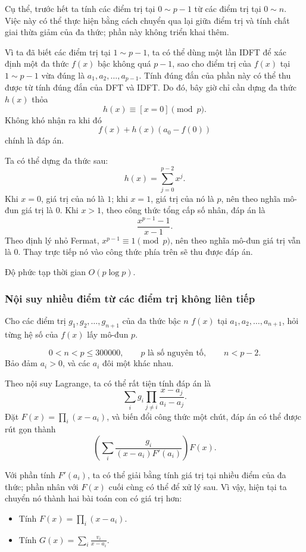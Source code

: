 \documentclass[11pt]{article}
\begin{document}
Cụ thể, trước hết ta tính các điểm trị tại \(0\sim p-1\) từ các điểm trị tại
\(0\sim n\). Việc này có thể thực hiện bằng cách chuyển qua lại giữa điểm trị
và tính chất giai thừa giảm của đa thức; phần này không triển khai thêm.

Vì ta đã biết các điểm trị tại \(1\sim p-1\), ta có thể dùng một lần IDFT để
xác định một đa thức \(f(x)\) bậc không quá \(p-1\), sao cho điểm trị của
\(f(x)\) tại \(1\sim p-1\) vừa đúng là \(a_1,a_2,\ldots,a_{p-1}\). Tính đúng
đắn của phần này có thể thu được từ tính đúng đắn của DFT và IDFT. Do đó, bây
giờ chỉ cần dựng đa thức \(h(x)\) thỏa
\[
h(x)\equiv [x=0]\pmod p.
\]
Không khó nhận ra khi đó
\[
f(x)+h(x)(a_0-f(0))
\]
chính là đáp án.

Ta có thể dựng đa thức sau:
\[
h(x)=\sum_{j=0}^{p-2}x^j.
\]
Khi \(x=0\), giá trị của nó là \(1\); khi \(x=1\), giá trị của nó là \(p\), nên
theo nghĩa mô-đun giá trị là \(0\). Khi \(x>1\), theo công thức tổng cấp số
nhân, đáp án là
\[
\frac{x^{p-1}-1}{x-1}.
\]
Theo định lý nhỏ Fermat, \(x^{p-1}\equiv 1\pmod p\), nên theo nghĩa mô-đun giá
trị vẫn là \(0\). Thay trực tiếp nó vào công thức phía trên sẽ thu được đáp án.

Độ phức tạp thời gian \(O(p\log p)\).

\subsubsection{Nội suy nhiều điểm từ các điểm trị không liên tiếp}

 Cho các điểm trị \(g_1,g_2,\ldots,g_{n+1}\) của đa thức bậc
\(n\) \(f(x)\) tại \(a_1,a_2,\ldots,a_{n+1}\), hỏi từng hệ số của \(f(x)\) lấy
mô-đun \(p\).

\[
0<n<p\le 300000,\qquad p \text{ là số nguyên tố},\qquad n<p-2.
\]
Bảo đảm \(a_i>0\), và các \(a_i\) đôi một khác nhau.

 Theo nội suy Lagrange, ta có thể rất tiện tính đáp án là
\[
\sum_i g_i\prod_{j\ne i}\frac{x-a_j}{a_i-a_j}.
\]
Đặt \(F(x)=\prod_i(x-a_i)\), và biến đổi công thức một chút, đáp án có thể được
rút gọn thành
\[
\left(\sum_i\frac{g_i}{(x-a_i)F'(a_i)}\right)F(x).
\]

Với phần tính \(F'(a_i)\), ta có thể giải bằng tính giá trị tại nhiều điểm của
đa thức; phần nhân với \(F(x)\) cuối cùng có thể để xử lý sau. Vì vậy, hiện tại
ta chuyển nó thành hai bài toán con có giá trị hơn:

\begin{itemize}
  \item Tính \(F(x)=\prod_i(x-a_i)\).
  \item Tính \(G(x)=\sum_i\frac{v_i}{x-a_i}\).
\end{itemize}
\end{document}

